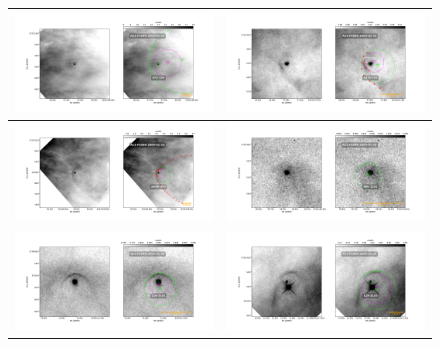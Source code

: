 \begin{figure}[htp]
\begin{tabular}{|l|l|}
    \includegraphics[width=0.47\linewidth,  trim=60 50 100 50, clip]{j8oc09010_wcs/072-134-Bally_09-images.pdf}
    &\includegraphics[width=0.47\linewidth,  trim=60 50 100 50, clip]{j8oc09010_wcs/4578-251-Bally_09-images.pdf}\\ \hline
    \includegraphics[width=0.47\linewidth,  trim=60 50 100 50, clip]{j8oc09010_wcs/w000-400-Bally_09-images.pdf}
    &\includegraphics[width=0.47\linewidth,  trim=60 50 100 50, clip]{j8oc14010_wcs/066-3251-Bally_14-images.pdf}\\ \hline
    \includegraphics[width=0.47\linewidth,  trim=60 50 100 50, clip]{j8oc14010_wcs/116-3101-Bally_14-images.pdf}
   &\includegraphics[width=0.47\linewidth,  trim=60 50 100 50, clip]{j8oc14010_wcs/119-3155-Bally_14-images.pdf}\\ \hline
    
 \end{tabular}
\end{figure}

